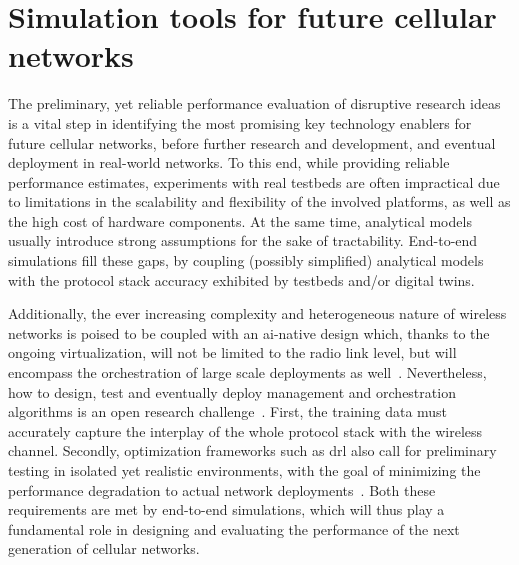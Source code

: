 \chapter{Simulation tools for future cellular networks}
\label{ch:sim-tools}

The preliminary, yet reliable performance evaluation of disruptive research ideas is a vital step in identifying the most promising key technology enablers for future cellular networks, before further research and development, and eventual deployment in real-world networks.
To this end, while providing reliable performance estimates, experiments with real testbeds are often impractical due to limitations in the scalability and flexibility of the involved platforms, as well as the high cost of hardware components. At the same time, analytical models usually introduce strong assumptions for the sake of tractability. End-to-end simulations fill these gaps, by coupling (possibly simplified) analytical models with the protocol stack accuracy exhibited by testbeds and/or digital twins.

Additionally, the ever increasing complexity and heterogeneous nature of wireless networks is poised to be coupled with an \gls{ai}-native design which, thanks to the ongoing virtualization, will not be limited to the radio link level, but will encompass the orchestration of large scale deployments as well~\cite{polese2023understanding}.
Nevertheless, how to design, test and eventually deploy management and orchestration algorithms is an open research challenge~\cite{polese2022colo}.
First, the training data must accurately capture the interplay of the whole protocol stack with the wireless channel. Secondly, optimization frameworks such as \gls{drl} also call for preliminary testing in isolated yet realistic environments, with the goal of minimizing the performance degradation to actual network deployments~\cite{lacava2023programmable, amir2023safehaul}.
Both these requirements are met by end-to-end simulations, which will thus play a fundamental role in designing and evaluating the performance of the next generation of cellular networks.



